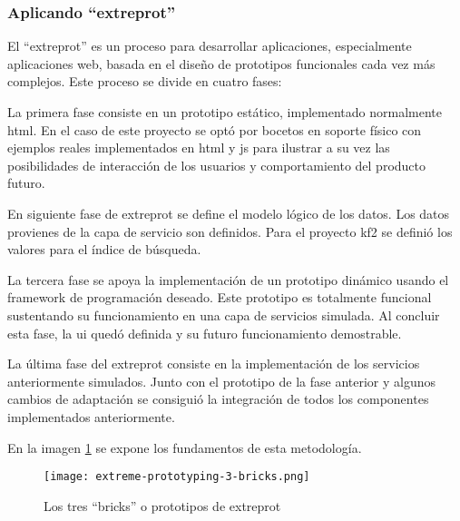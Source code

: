 \subsubsection{Aplicando ``\gls{extreprot}''}
\label{subsubsection:aplicandoextre}
El ``\gls{extreprot}'' es un proceso para desarrollar aplicaciones, especialmente aplicaciones web, basada en el diseño de \glspl{prototipo} funcionales cada vez más complejos. Este proceso se divide en cuatro fases: 
\begin{itemize}
 La primera fase consiste en un \gls{prototipo} estático, implementado normalmente \gls{html}. En el caso de este proyecto se optó por bocetos en soporte físico con ejemplos reales implementados en \gls  {html} y \gls{js} para ilustrar a su vez las posibilidades de interacción de los usuarios y comportamiento del producto futuro.

 En siguiente fase de \gls{extreprot}  se define el modelo lógico de los datos. Los datos provienes de la capa de servicio son definidos. Para el proyecto \gls{kf2} se definió los valores para el índice de búsqueda.

 La tercera fase se apoya la implementación de un \gls{prototipo} dinámico usando el \gls{framework} de programación deseado. Este \gls{prototipo} es totalmente funcional sustentando su funcionamiento en una capa de servicios simulada. Al concluir esta fase, la \gls{ui} quedó definida y su futuro funcionamiento demostrable. 

 La última fase del \gls{extreprot}  consiste en la implementación de los servicios anteriormente simulados. Junto con el \gls{prototipo} de la fase anterior y algunos cambios de adaptación se consiguió la integración de todos los componentes implementados anteriormente. 
\end{itemize}

En la imagen \ref{image:extreprot} se expone los fundamentos de esta metodología.\\

\begin{figure}[h!]
  \centering
     \texttt{[image: extreme-prototyping-3-bricks.png]}
  \caption{Los tres ``bricks'' o \glspl{prototipo} de \gls{extreprot} \cite{extrPro}}
  \label{image:extreprot}
\end{figure}

